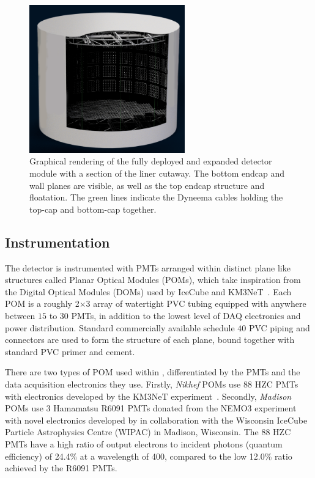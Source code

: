 \begin{figure} %
    \includegraphics[width=0.6\textwidth]{diagrams/4-chips/chips_render_1.png}
    \caption[Graphical rendering of the \chipsfive detector.]
    {Graphical rendering of the fully deployed and expanded \chipsfive detector module with a
        section of the liner cutaway. The bottom endcap and wall planes are visible, as well as
        the top endcap structure and floatation. The green lines indicate the Dyneema cables
        holding the top-cap and bottom-cap together.}
    \label{fig:chips_render}
\end{figure}

\subsection{Instrumentation} %
\label{sec:chips_detector_instrumentation} %

The \chipsfive detector is instrumented with PMTs arranged within distinct plane like structures
called Planar Optical Modules (POMs), which take inspiration from the Digital Optical Modules
(DOMs) used by IceCube and KM3NeT~\cite{hanson2006, eijk2015}. Each POM is a roughly
\unit{2}{}$\times$\unit{3}{} array of watertight PVC tubing equipped with
anywhere between $15$ to $30$ PMTs, in addition to the lowest level of DAQ electronics and power
distribution. Standard commercially available schedule $40$ PVC piping and connectors are used to
form the structure of each plane, bound together with standard PVC primer and cement.

There are two types of POM used within \chipsfive, differentiated by the PMTs and the data
acquisition electronics they use. Firstly, \emph{Nikhef} POMs use \unit{88}{} HZC PMTs
with electronics developed by the KM3NeT experiment~\cite{katz2009, adrian2016}. Secondly,
\emph{Madison} POMs use \unit{3}{} Hamamatsu R6091 PMTs donated from the NEMO3
experiment~\cite{arnold2005} with novel electronics developed by \chips in collaboration with the
Wisconsin IceCube Particle Astrophysics Centre (WIPAC) in Madison, Wisconsin. The
\unit{88}{} HZC PMTs have a high ratio of output electrons to incident photons (quantum
efficiency) of 24.4\% at a wavelength of \unit{400}{}, compared to the low 12.0\% ratio
achieved by the R6091 PMTs.

